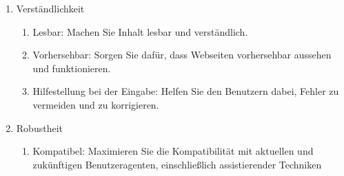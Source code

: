 \begin{enumerate}
\begin{enumerate}
    \end{enumerate}
    \item Verständlichkeit
    \begin{enumerate} 
        \item Lesbar: Machen Sie Inhalt lesbar und verständlich.
        \item Vorhersehbar: Sorgen Sie dafür, dass Webseiten vorhersehbar aussehen und funktionieren.
        \item Hilfestellung bei der Eingabe: Helfen Sie den Benutzern dabei, Fehler zu vermeiden und zu korrigieren.
    \end{enumerate}
    \item Robustheit
    \begin{enumerate}
        \item Kompatibel: Maximieren Sie die Kompatibilität mit aktuellen und zukünftigen Benutzeragenten, einschließlich assistierender Techniken
    \end{enumerate}
\end{enumerate}

\fi
